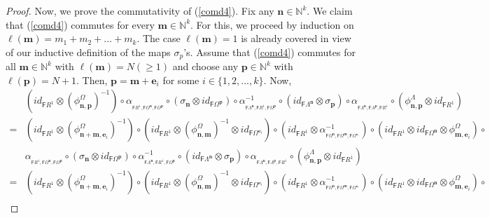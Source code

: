 \documentclass[12pt]{amsart}
\newcommand{\N}{\mathbf{n}}
\newcommand{\M}{\mathbf{m}}
\theoremstyle{definition}
\theoremstyle{remark}
\begin{document}
\begin{proof}
Now, we prove the commutativity of (\ref{comd4}). Fix any $\N\in \mathbb{N}^k$. We claim that (\ref{comd4}) commutes for every $\M\in \mathbb{N}^k$. For this, we proceed by induction on $\ell(\M)=m_1+m_2+\dots+m_k$. The case $\ell(\M)=1$ is already covered in view of our inductive definition of the maps $\sigma_p$'s. Assume that (\ref{comd4}) commutes for all $\M\in \mathbb{N}^k$ with $\ell(\M)=N(\ge 1)$ and choose any $\mathbf{p}\in \mathbb{N}^k$ with $\ell(\mathbf{p})=N+1$. Then, $\mathbf{p}=\M+\mathbf{e}_i$ for some $i\in \{1,2,\ldots,k\}$. Now, 
{\allowdisplaybreaks
\begin{align*}
    &\left(id_{\mathsf{F}R^1}\otimes (\phi_{\N,\mathbf{p}}^\Omega)^{-1}\right) \circ \alpha_{_{\mathsf{F}R^1,\mathsf{F}\Omega^\N,\mathsf{F}\Omega^\mathbf{p}}}\circ \left(\sigma_\N\otimes id_{\mathsf{F}\Omega^\mathbf{p}}\right)\circ \alpha_{_{\mathsf{F}\Lambda^\N,\mathsf{F}R^1,\mathsf{F}\Omega^\mathbf{p}}}^{-1}\circ \left(id_{\mathsf{F}\Lambda^\N}\otimes \sigma_\mathbf{p}\right)\circ \alpha_{_{\mathsf{F}\Lambda^\N,\mathsf{F}\Lambda^\mathbf{p},\mathsf{F}R^1}}\circ \left(\phi_{\N,\mathbf{p}}^\Lambda\otimes id_{\mathsf{F}R^1}\right)\\    
    =&\left(id_{\mathsf{F}R^1}\otimes (\phi_{\N+\M,\mathbf{e}_i}^\Omega)^{-1}\right)\circ \left(id_{\mathsf{F}R^1}\otimes (\phi_{\N,\M}^\Omega)^{-1}\otimes id_{\mathsf{F}\Omega^{\mathbf{e}_i}}\right)\circ \left(id_{\mathsf{F}R^1}\otimes \alpha_{_{\mathsf{F}\Omega^\N,\mathsf{F}\Omega^\M,\mathsf{F}\Omega^{\mathbf{e}_i}}}^{-1}\right)\circ \left(id_{\mathsf{F}R^1}\otimes id_{\mathsf{F}\Omega^\N}\otimes \phi_{\M,\mathbf{e}_i}^\Omega\right)\circ \\
    &\alpha_{_{\mathsf{F}R^1,\mathsf{F}\Omega^\N,\mathsf{F}\Omega^\mathbf{p}}}\circ \left(\sigma_\N\otimes id_{\mathsf{F}\Omega^\mathbf{p}}\right)\circ \alpha_{_{\mathsf{F}\Lambda^\N,\mathsf{F}R^1,\mathsf{F}\Omega^\mathbf{p}}}^{-1}\circ \left(id_{\mathsf{F}\Lambda^\N}\otimes \sigma_\mathbf{p}\right)\circ \alpha_{_{\mathsf{F}\Lambda^\N,\mathsf{F}\Lambda^\mathbf{p},\mathsf{F}R^1}}\circ \left(\phi_{\N,\mathbf{p}}^\Lambda\otimes id_{\mathsf{F}R^1}\right)\\
    =&\left(id_{\mathsf{F}R^1}\otimes (\phi_{\N+\M,\mathbf{e}_i}^\Omega)^{-1}\right)\circ \left(id_{\mathsf{F}R^1}\otimes (\phi_{\N,\M}^\Omega)^{-1}\otimes id_{\mathsf{F}\Omega^{\mathbf{e}_i}}\right)\circ \left(id_{\mathsf{F}R^1}\otimes \alpha_{_{\mathsf{F}\Omega^\N,\mathsf{F}\Omega^\M,\mathsf{F}\Omega^{\mathbf{e}_i}}}^{-1}\right)\circ \left(id_{\mathsf{F}R^1}\otimes id_{\mathsf{F}\Omega^\N}\otimes \phi_{\M,\mathbf{e}_i}^\Omega\right)\circ \\

\end{align*}}
\end{proof}
\end{document}
